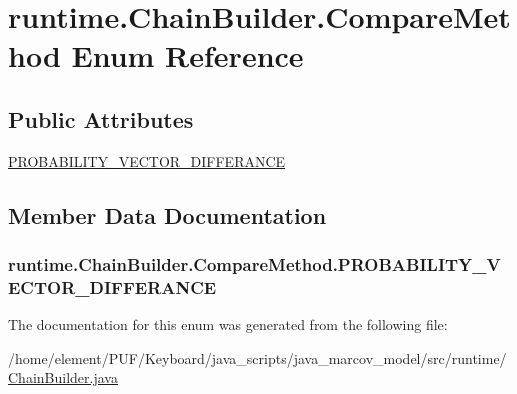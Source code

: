 \hypertarget{enumruntime_1_1_chain_builder_1_1_compare_method}{}\section{runtime.\+Chain\+Builder.\+Compare\+Method Enum Reference}
\label{enumruntime_1_1_chain_builder_1_1_compare_method}
\subsection*{Public Attributes}
\begin{DoxyCompactItemize}
\item 
\hyperlink{enumruntime_1_1_chain_builder_1_1_compare_method_a98895b1f0e70abffdabedbbac9a45bd4}{P\+R\+O\+B\+A\+B\+I\+L\+I\+T\+Y\+\_\+\+V\+E\+C\+T\+O\+R\+\_\+\+D\+I\+F\+F\+E\+R\+A\+N\+CE}
\end{DoxyCompactItemize}


\subsection{Member Data Documentation}
\subsubsection[{\texorpdfstring{P\+R\+O\+B\+A\+B\+I\+L\+I\+T\+Y\+\_\+\+V\+E\+C\+T\+O\+R\+\_\+\+D\+I\+F\+F\+E\+R\+A\+N\+CE}{PROBABILITY_VECTOR_DIFFERANCE}}]{\setlength{\rightskip}{0pt plus 5cm}runtime.\+Chain\+Builder.\+Compare\+Method.\+P\+R\+O\+B\+A\+B\+I\+L\+I\+T\+Y\+\_\+\+V\+E\+C\+T\+O\+R\+\_\+\+D\+I\+F\+F\+E\+R\+A\+N\+CE}\hypertarget{enumruntime_1_1_chain_builder_1_1_compare_method_a98895b1f0e70abffdabedbbac9a45bd4}{}\label{enumruntime_1_1_chain_builder_1_1_compare_method_a98895b1f0e70abffdabedbbac9a45bd4}


The documentation for this enum was generated from the following file\+:\begin{DoxyCompactItemize}
\item 
/home/element/\+P\+U\+F/\+Keyboard/java\+\_\+scripts/java\+\_\+marcov\+\_\+model/src/runtime/\hyperlink{_chain_builder_8java}{Chain\+Builder.\+java}\end{DoxyCompactItemize}
